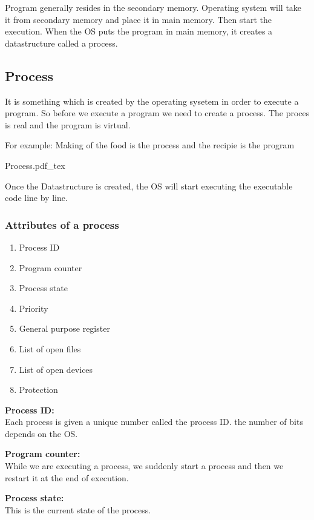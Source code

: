 \documentclass[12pt,letterpaper]{article}
\begin{document}
Program generally resides in the secondary memory. Operating system will take it from secondary memory and place it in main memory. Then start the execution. 
When the OS puts the program in main memory, it creates a datastructure called a process. 

\subsection{Process}
It is something which is created by the operating sysetem in order to execute a program. So before we execute a program we need to create a process. The proces is real and the program is virtual. 

For example: Making of the food is the process and the recipie is the program

\begin{center}
  {Process.pdf_tex}
\end{center}

Once the Datastructure is created, the OS will start executing the executable code line by line. 

\subsubsection{Attributes of a process}

\begin{enumerate}
  \item Process ID 
  \item Program counter 
  \item Process state
  \item Priority 
  \item General purpose register
  \item List of open files 
  \item List of open devices 
  \item Protection
\end{enumerate} 

\textbf{Process ID:}\\
Each process is given a unique number called the process ID. the number of bits depends on the OS. 

\textbf{Program counter:}\\
While we are executing a process, we suddenly start a process and then we restart it at the end of execution. 

\textbf{Process state:}\\
This is the current state of the process. 
\end{document}
